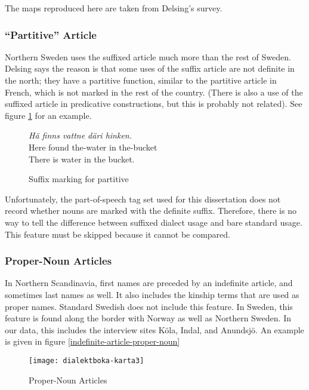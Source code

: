 The maps reproduced here are taken from Delsing's survey.

\subsubsection{``Partitive'' Article}

Northern Sweden uses the suffixed article much more than the rest of
Sweden. Delsing says the reason is that some uses of the suffix
article are not definite in the north; they have a partitive function,
similar to the partitive article in French, which is not marked in the
rest of the country. (There is also a use of the suffixed article in
predicative constructions, but this is probably not related). See
figure \ref{partitive-article} for an example.


\begin{figure}
  {\it H\"a finns vattne d\"ari hinken.} \\
  Here found the-water in the-bucket \\
  There is water in the bucket. \\
  \caption{Suffix marking for partitive}
  \label{partitive-article}
\end{figure}

Unfortunately, the part-of-speech tag set used for this
dissertation does not record whether nouns are marked with the
definite suffix. Therefore, there is no way to tell the difference
between suffixed dialect usage and bare standard usage. This feature
must be skipped because it cannot be compared.

\subsubsection{Proper-Noun Articles}

In Northern Scandinavia, first names are preceded by an indefinite
article, and sometimes last names as well. It also includes the
kinship terms that are used as proper names. Standard Swedish does not
include this feature. In Sweden, this feature is found along the border
with Norway as well as Northern Sweden. In our data, this includes the
interview sites K\"ola, Indal, and Anundsj\"o. An example is given in
figure \ref{indefinite-article-proper-noun}

\begin{figure}
  \texttt{[image: dialektboka-karta3]}
  \caption{Proper-Noun Articles}
  \label{indefinite-article-proper-noun-map}
\end{figure}

